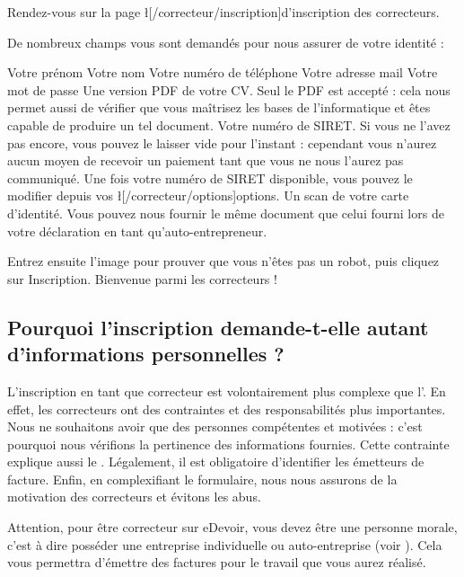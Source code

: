 ﻿Rendez-vous sur la page \l[/correcteur/inscription]{d’inscription des correcteurs}.

De nombreux champs vous sont demandés pour nous assurer de votre identité :
\begin{itemize}
\li Votre prénom
\li Votre nom
\li Votre numéro de téléphone
\li Votre adresse mail
\li Votre mot de passe
\li Une version PDF de votre CV.  Seul le PDF est accepté : cela nous permet aussi de vérifier que vous maîtrisez les bases de l’informatique et êtes capable de produire un tel document.
\li Votre numéro de SIRET.  Si vous ne l’avez pas encore, vous pouvez le laisser vide pour l’instant : cependant vous n’aurez aucun moyen de recevoir un paiement tant que vous ne nous l’aurez pas communiqué. Une fois votre numéro de SIRET disponible, vous pouvez le modifier depuis vos \l[/correcteur/options]{options}.
\li Un scan de votre carte d’identité. Vous pouvez nous fournir le même document que celui fourni lors de votre déclaration en tant qu’auto-entrepreneur.
\end{itemize}

Entrez ensuite l’image pour prouver que vous n’êtes pas un robot, puis cliquez sur Inscription. Bienvenue parmi les correcteurs !

\subsection{Pourquoi l’inscription demande-t-elle autant d’informations personnelles ?}
L’inscription en tant que correcteur est volontairement plus complexe que l’. En effet, les correcteurs ont des contraintes et des responsabilités plus importantes. Nous ne souhaitons avoir que des personnes compétentes et motivées : c’est pourquoi nous vérifions la pertinence des informations fournies. Cette contrainte explique aussi le .
Légalement, il est obligatoire d’identifier les émetteurs de facture.
Enfin, en complexifiant le formulaire, nous nous assurons de la motivation des correcteurs et évitons les abus.

Attention, pour être correcteur sur eDevoir, vous devez être une personne morale, c’est à dire posséder une entreprise individuelle ou auto-entreprise (voir ). Cela vous permettra d’émettre des factures pour le travail que vous aurez réalisé.